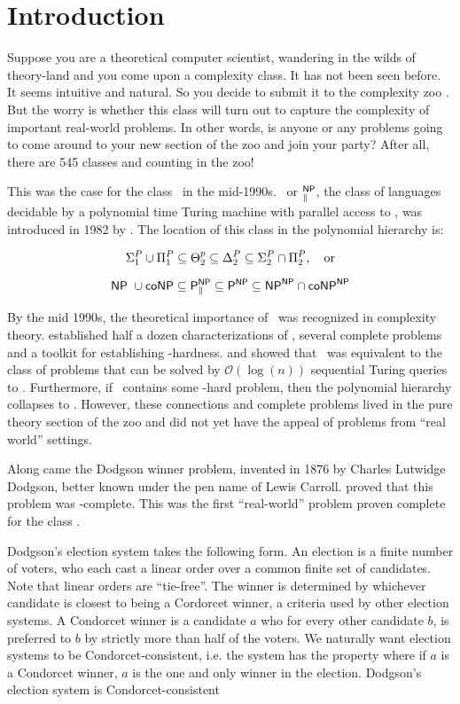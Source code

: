 \section{Introduction}\label{sec:intro}

    Suppose you are a theoretical computer scientist, wandering in the wilds
of theory-land and you come upon a complexity class.
It has not been seen before.
It seems intuitive and natural.
So you decide to submit it to the complexity zoo \citep{zoo}.
But the worry is whether this class will turn out to capture the complexity
of important real-world problems.
In other words, is anyone or any problems going to come around to your new
section of the zoo and join your party?
After all, there are 545 classes and counting
in the zoo!

This was the case for the class \tp~in the mid-1990s.
\tp~or $^{\mathsf{NP}}_{\parallel}$, the class of
languages decidable by a polynomial time Turing machine with parallel access to
\np, was introduced in 1982 by \citet{PZ83}.
The location of this class in the polynomial hierarchy is:


   $$\Sigma^{P}_{1} \cup \Pi^{P}_{1} \subseteq
    \Theta^{p}_2 \subseteq \Delta^{P}_2
    \subseteq \Sigma^{P}_{2} \cap \Pi^{P}_{2},~~~\text{or}$$

  $$\mathsf{NP}~\cup \mathsf{coNP} \subseteq \mathsf{P}^{\mathsf{NP}}_{\parallel}
    \subseteq \mathsf{P}^{\mathsf{NP}} \subseteq \mathsf{NP}^{\mathsf{NP}} \cap \mathsf{coNP}^{\mathsf{NP}}$$


By the mid 1990s, the theoretical importance of \tp~was recognized in complexity theory.
\citet{wag90} established half a dozen characterizations of \tp,
several complete problems and a toolkit for establishing \tp-hardness.
\citet{hem87} and \citet{ksw87} showed that \tp~was equivalent to the class of
problems that can be solved by $\mathcal{O}(\log(n))$ sequential Turing queries to \np.
Furthermore, if \np~contains some \tp-hard problem, then the polynomial hierarchy
collapses to \np.
However, these connections and complete problems
lived in the pure theory section of the zoo and did not yet have the appeal of
problems from ``real world'' settings.

Along came the Dodgson winner problem, invented in 1876 by Charles Lutwidge
Dodgson, better known under the pen name of Lewis Carroll.
\citet{exactdodgson} proved that this problem was \tp-complete.
This was the first ``real-world'' problem proven complete for the class \tp.

Dodgson's election system takes the following form.
An election is a finite number of voters, who each cast a linear order
over a common finite set of candidates.
Note that linear orders are ``tie-free''.
The winner is determined by whichever candidate is closest to being a Cordorcet
winner, a criteria used by other election systems.
A Condorcet winner is a candidate $a$ who for every other candidate $b$, is
preferred to $b$ by strictly more than half of the voters.
We naturally want election systems to be Condorcet-consistent, i.e. the system
has the property where if $a$ is a Condorcet winner, $a$ is the one and only
winner in the election.
Dodgson's election system is Condorcet-consistent \citep{handbookcss}

